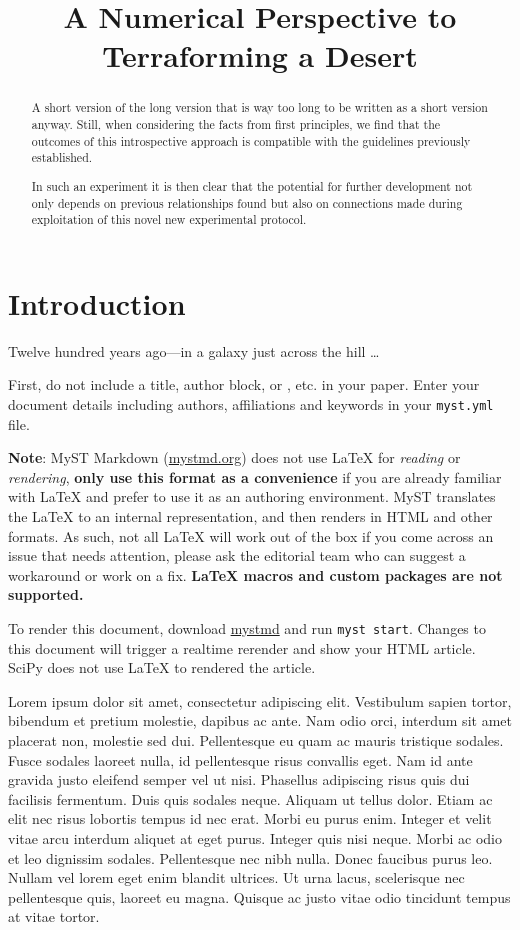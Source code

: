 \title{A Numerical Perspective to Terraforming a Desert}

\begin{abstract}
   A short version of the long version that is way too long to be written as a short version anyway. Still, when considering the facts from first principles, we find that the outcomes of this introspective approach is compatible with the guidelines previously established.

   In such an experiment it is then clear that the potential for further development not only depends on previous relationships found but also on connections made during exploitation of this novel new experimental protocol.
\end{abstract}

\section{Introduction}\label{introduction}

Twelve hundred years ago—in a galaxy just across the hill \ldots

First, do not include a title, author block, or \verb||, etc.
in your paper. Enter your document details including authors, affiliations and keywords in your \texttt{myst.yml} file.

\textbf{Note}: MyST Markdown (\href{https://mystmd.org}{mystmd.org}) does not use
LaTeX for \emph{reading} or \emph{rendering}, \textbf{only use this format as a convenience} if you are
already familiar with LaTeX and prefer to use it as an authoring environment.
MyST translates the LaTeX to an internal representation, and then renders in HTML and other formats.
As such, not all LaTeX will work out of the box if you come across an issue that needs attention,
please ask the editorial team who can suggest a workaround or work on a fix.
\textbf{LaTeX macros and custom packages are not supported.}

To render this document, download \href{https://mystmd.org/guide/quickstart}{mystmd} and run \texttt{myst start}.
Changes to this document will trigger a realtime rerender and show your HTML article.
SciPy does not use LaTeX to rendered the article.

Lorem ipsum dolor sit amet, consectetur adipiscing elit. Vestibulum sapien
tortor, bibendum et pretium molestie, dapibus ac ante. Nam odio orci, interdum
sit amet placerat non, molestie sed dui. Pellentesque eu quam ac mauris
tristique sodales. Fusce sodales laoreet nulla, id pellentesque risus convallis
eget. Nam id ante gravida justo eleifend semper vel ut nisi. Phasellus
adipiscing risus quis dui facilisis fermentum. Duis quis sodales neque. Aliquam
ut tellus dolor. Etiam ac elit nec risus lobortis tempus id nec erat. Morbi eu
purus enim. Integer et velit vitae arcu interdum aliquet at eget purus. Integer
quis nisi neque. Morbi ac odio et leo dignissim sodales. Pellentesque nec nibh
nulla. Donec faucibus purus leo. Nullam vel lorem eget enim blandit ultrices.
Ut urna lacus, scelerisque nec pellentesque quis, laoreet eu magna. Quisque ac
justo vitae odio tincidunt tempus at vitae tortor.


